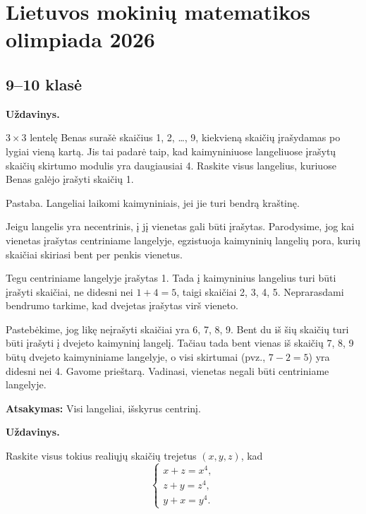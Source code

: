 \documentclass[11pt, a4paper]{scrreprt}
\newenvironment{problem}
    {\par\medskip\noindent\textbf{Uždavinys.}\par\smallskip}
    {\par\medskip}
\begin{document}
\chapter*{Lietuvos mokinių matematikos olimpiada 2026}

\section*{9--10 klasė}

\begin{problem}
$3\times3$ lentelę Benas surašė skaičius 1, 2, \dots, 9, kiekvieną skaičių įrašydamas po lygiai vieną kartą. Jis tai padarė taip, kad kaimyniniuose langeliuose įrašytų skaičių skirtumo modulis yra daugiausiai 4. Raskite visus langelius, kuriuose Benas galėjo įrašyti skaičių 1.

Pastaba. Langeliai laikomi kaimyniniais, jei jie turi bendrą kraštinę.
\end{problem}

\begin{soln}
Jeigu langelis yra necentrinis, į jį vienetas gali būti įrašytas. Parodysime, jog kai vienetas įrašytas centriniame langelyje, egzistuoja kaimyninių langelių pora, kurių skaičiai skiriasi bent per penkis vienetus.

Tegu centriniame langelyje įrašytas 1. Tada į kaimyninius langelius turi būti įrašyti skaičiai, ne didesni nei $1+4=5$, taigi skaičiai 2, 3, 4, 5. Neprarasdami bendrumo tarkime, kad dvejetas įrašytas virš vieneto.

Pastebėkime, jog likę neįrašyti skaičiai yra 6, 7, 8, 9. Bent du iš šių skaičių turi būti įrašyti į dvejeto kaimyninį langelį. Tačiau tada bent vienas iš skaičių 7, 8, 9 būtų dvejeto kaimyniniame langelyje, o visi skirtumai (pvz., $7-2=5$) yra didesni nei 4. Gavome prieštarą. Vadinasi, vienetas negali būti centriniame langelyje.

\textbf{Atsakymas:} Visi langeliai, išskyrus centrinį.
\end{soln}

\vspace{1cm}

\begin{problem}
Raskite visus tokius realiųjų skaičių trejetus $(x, y, z)$, kad
\begin{equation*}
\begin{cases}
x+z=x^{4},\\ 
z+y=z^{4},\\ 
y+x=y^{4}.
\end{cases}
\end{equation*}
\end{problem}
\end{document}
